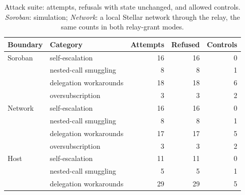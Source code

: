 \begin{table}[t]
\caption{Attack suite: attempts, refusals with state unchanged, and allowed
controls. \emph{Soroban}: simulation; \emph{Network}: a local Stellar network
through the relay, the same counts in both relay-grant modes.}\label{tab:attacks}
\small
\setlength\tabcolsep{4pt}
\begin{tabular}{@{}llrrr@{}}
\toprule
\textbf{Boundary} & \textbf{Category} & \textbf{Attempts} & \textbf{Refused} & \textbf{Controls} \\
\midrule
Soroban & self-escalation & 16 & 16 & 0 \\
 & nested-call smuggling & 8 & 8 & 1 \\
 & delegation workarounds & 18 & 18 & 6 \\
 & oversubscription & 3 & 3 & 2 \\
Network & self-escalation & 16 & 16 & 0 \\
 & nested-call smuggling & 8 & 8 & 1 \\
 & delegation workarounds & 17 & 17 & 5 \\
 & oversubscription & 3 & 3 & 2 \\
Host & self-escalation & 11 & 11 & 0 \\
 & nested-call smuggling & 5 & 5 & 1 \\
 & delegation workarounds & 29 & 29 & 5 \\
\bottomrule
\end{tabular}
\end{table}

